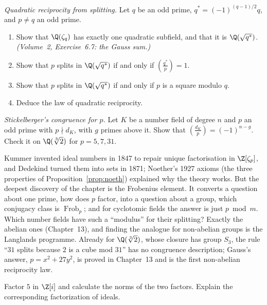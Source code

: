 \begin{exercise}[$\star\star\star$]\label{ex:qrsplit}
\emph{Quadratic reciprocity from splitting.} Let $q$ be an odd prime, $q^*=(-1)^{(q-1)/2}q$, and $p\ne q$ an odd prime.
\begin{enumerate}[label=(\alph*)]
\item Show that $\Q(\zeta_q)$ has exactly one quadratic subfield, and that it is $\Q(\sqrt{q^*})$. \emph{(Volume~2,
Exercise~6.7: the Gauss sum.)}
\item Show that $p$ splits in $\Q(\sqrt{q^*})$ if and only if $\left(\frac{q^*}p\right)=1$.
\item Show that $p$ splits in $\Q(\sqrt{q^*})$ if and only if $p$ is a square modulo $q$.
\item Deduce the law of quadratic reciprocity.
\end{enumerate}
\end{exercise}

\begin{exercise}[$\star\star\star$]\label{ex:stickelbergerp}
\emph{Stickelberger's congruence for $p$.} Let $K$ be a number field of degree $n$ and $p$ an odd prime with $p\nmid d_K$,
with $g$ primes above it. Show that $\left(\frac{d_K}p\right)=(-1)^{n-g}$. Check it on $\Q(\sqrt[3]2)$ for $p=5,7,31$.
\end{exercise}

\begin{beauty}
Kummer invented ideal numbers in 1847 to repair unique factorisation in $\Z[\zeta_p]$, and Dedekind turned them into sets
in 1871; Noether's 1927 axioms (the three properties of Proposition~\ref{prop:noeth}) explained why the theory works. But the
deepest discovery of the chapter is the Frobenius element. It converts a question about one prime, how does $p$
factor, into a question about a group, which conjugacy class is $\operatorname{Frob}_p$; and for cyclotomic fields the
answer is just $p\bmod m$. Which number fields have such a ``modulus'' for their splitting? Exactly the abelian ones
(Chapter~13), and finding the analogue for non-abelian groups is the Langlands programme. Already for $\Q(\sqrt[3]2)$,
whose closure has group $S_3$, the rule ``$31$ splits because $2$ is a cube mod $31$'' has no congruence description;
Gauss's answer, $p=x^2+27y^2$, is proved in Chapter~13 and is the first non-abelian reciprocity law.
\end{beauty}

\begin{exercise}[$\star$]\label{ex:v13-extra-04-1}
Factor $5$ in $\Z[i]$ and calculate the norms of the two factors. Explain the corresponding factorization of ideals.
\end{exercise}

